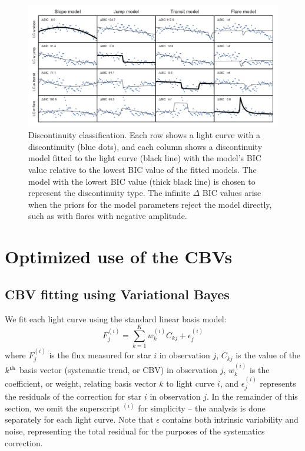 \documentclass[useAMS,usenatbib]{mn2e}
\begin{document}
\begin{figure}
 \centering
 \includegraphics[width=\textwidth]{discontinuity_classification.pdf}
 \caption{Discontinuity classification. Each row shows a light curve with a discontinuity (blue dots), and each column shows a discontinuity model fitted to the light curve (black line) with the model's BIC value relative to the lowest BIC value of the fitted models. The model with the lowest BIC value (thick black line) is chosen to represent the discontinuity type. The infinite $\Delta$ BIC values arise when the priors for the model parameters reject the model directly, such as with flares with negative amplitude.}
 \label{fig:jump_classification}
\end{figure}


\section{Optimized use of the CBVs}
\label{sec:cbv}

\subsection{CBV fitting using Variational Bayes}

We fit each light curve using the standard linear basis model:
\begin{equation}
F^{(i)}_j = \sum_{k=1}^K w^{(i)}_k C_{kj} + \epsilon^{(i)}_j
\end{equation}
where $F^{(i)}_j$ is the flux measured for star $i$ in observation
$j$, $C_{kj}$ is the value of the $k^{\rm th}$ basis vector
(systematic trend, or CBV) in observation $j$, $w^{(i)}_k$ is the
coefficient, or weight, relating basis vector $k$ to light curve $i$,
and $\epsilon^{(i)}_j$ represents the residuals of the correction for
star $i$ in observation $j$. In the remainder of this section, we omit
the superscript $^{(i)}$ for simplicity -- the analysis is done
separately for each light curve. Note that $\epsilon$ contains both
intrinsic variability and noise, representing the total residual for the
purposes of the systematics correction.
\end{document}
